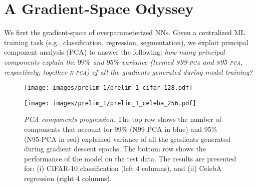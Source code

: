 \documentclass{article}
\newcommand{\shams}[1]{{\color{red}{#1}}}
\renewcommand{\shams}[1]{{\color{black}{#1}}}
\begin{document}

\vspace{-3mm}
\section{A Gradient-Space Odyssey} 
\label{sec:explore}
\vspace{-3mm}
We first \shams{start by directly studying the principal component analysis (PCA) of} the gradient-space of overparameterized NNs. Given a centralized ML training task (e.g., classification, regression, segmentation), we exploit principal component analysis (PCA) \citep{pearson1901liii} to answer the following: \textit{how many principal components explain the $99\%$ and $95\%$ variance (termed \textsc{n99-pca} and \textsc{n95-pca}, respectively; together \textsc{n-pca}) of all the gradients generated during model training?} 

\begin{figure}[t]
\centering
\begin{minipage}{.495\textwidth}
  \centering
  \centerline{\texttt{[image: images/prelim\_1/prelim\_1\_cifar\_128.pdf]}}
\end{minipage}
\begin{minipage}{.495\textwidth}
  \centering
  \centerline{\texttt{[image: images/prelim\_1/prelim\_1\_celeba\_256.pdf]}}
\end{minipage}
    \vspace{-4mm}
  \caption{\small{\textit{PCA components progression}. The top row shows the number of components that account for 99\% (N99-PCA in blue) and 95\% (N95-PCA in red) explained variance of all the gradients generated during gradient descent epochs. The bottom row shows the performance of the model on the test data. The results are presented for: (i) CIFAR-10 classification (left 4 columns), and (ii) CelebA regression (right 4 columns).}}
  \label{fig:prelim_1}
   \vspace{-4.5mm}
\end{figure}
\end{document}
